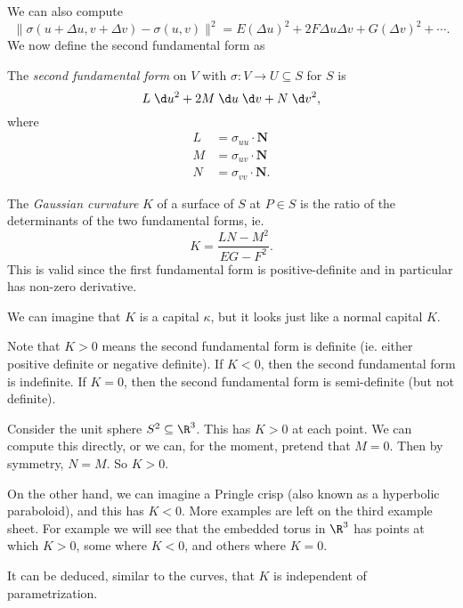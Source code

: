 \documentclass[a4paper]{article}
\begin{document}
We can also compute
\[
  \|\sigma(u + \Delta u, v + \Delta v) - \sigma(u, v)\|^2 = E (\Delta u)^2 + 2F \Delta u \Delta v + G (\Delta v)^2 + \cdots.
\]
We now define the second fundamental form as
\begin{defi}
  The \emph{second fundamental form} on $V$ with $\sigma: V \to U \subseteq S$ for $S$ is
  \[
    L \;\d u^2 + 2M \;\d u \;\d v + N \;\d v^2,
  \]
  where
  \begin{align*}
    L &= \sigma_{uu} \cdot \mathbf{N}\\
    M &= \sigma_{uv} \cdot \mathbf{N}\\
    N &= \sigma_{vv} \cdot \mathbf{N}.
  \end{align*}
\end{defi}

\begin{defi}
  The \emph{Gaussian curvature} $K$ of a surface of $S$ at $P \in S$ is the ratio of the determinants of the two fundamental forms, ie.
  \[
    K = \frac{LN - M^2}{EG - F^2}.
  \]
  This is valid since the first fundamental form is positive-definite and in particular has non-zero derivative.
\end{defi}
We can imagine that $K$ is a capital $\kappa$, but it looks just like a normal capital $K$.

Note that $K > 0$ means the second fundamental form is definite (ie. either positive definite or negative definite). If $K < 0$, then the second fundamental form is indefinite. If $K = 0$, then the second fundamental form is semi-definite (but not definite).

\begin{eg}
  Consider the unit sphere $S^2 \subseteq \R^3$. This has $K > 0$ at each point. We can compute this directly, or we can, for the moment, pretend that $M = 0$. Then by symmetry, $N = M$. So $K > 0$.

  On the other hand, we can imagine a Pringle crisp (also known as a hyperbolic paraboloid), and this has $K < 0$. More examples are left on the third example sheet. For example we will see that the embedded torus in $\R^3$ has points at which $K > 0$, some where $K < 0$, and others where $K = 0$.
\end{eg}
It can be deduced, similar to the curves, that $K$ is independent of parametrization.
\end{document}
